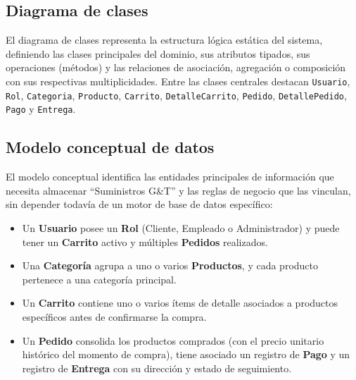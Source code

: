 
\subsection{Diagrama de clases}
El diagrama de clases representa la estructura lógica estática del sistema, definiendo las clases principales del dominio, sus atributos tipados, sus operaciones (métodos) y las relaciones de asociación, agregación o composición con sus respectivas multiplicidades. Entre las clases centrales destacan \texttt{Usuario}, \texttt{Rol}, \texttt{Categoria}, \texttt{Producto}, \texttt{Carrito}, \texttt{DetalleCarrito}, \texttt{Pedido}, \texttt{DetallePedido}, \texttt{Pago} y \texttt{Entrega}.


\subsection{Modelo conceptual de datos}
El modelo conceptual identifica las entidades principales de información que necesita almacenar ``Suministros G\&T'' y las reglas de negocio que las vinculan, sin depender todavía de un motor de base de datos específico:
\begin{itemize}
    \item Un \textbf{Usuario} posee un \textbf{Rol} (Cliente, Empleado o Administrador) y puede tener un \textbf{Carrito} activo y múltiples \textbf{Pedidos} realizados.
    \item Una \textbf{Categoría} agrupa a uno o varios \textbf{Productos}, y cada producto pertenece a una categoría principal.
    \item Un \textbf{Carrito} contiene uno o varios ítems de detalle asociados a productos específicos antes de confirmarse la compra.
    \item Un \textbf{Pedido} consolida los productos comprados (con el precio unitario histórico del momento de compra), tiene asociado un registro de \textbf{Pago} y un registro de \textbf{Entrega} con su dirección y estado de seguimiento.
\end{itemize}

